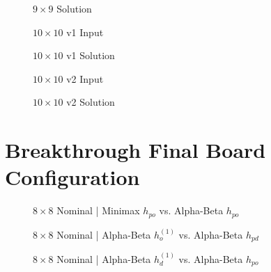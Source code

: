 \documentclass{article}[12pt]
\begin{document}
\begin{appendices}
\begin{figure}[!htb]
	\centering
	\caption{$9 \times 9$ Solution}
\end{figure}

\begin{figure}[!htb]
	\centering
	\caption{$10 \times 10$ v1 Input}
\end{figure}

\begin{figure}[!htb]
	\centering
	\caption{$10 \times 10$ v1 Solution}
\end{figure}
   
   \begin{figure}[!htb]
   	\centering
   	\caption{$10 \times 10$ v2 Input}
   \end{figure}
   
   \begin{figure}[!htb]
   	\centering
   	\caption{$10 \times 10$ v2 Solution}
   \end{figure}
   
   
   \section{Breakthrough Final Board Configuration}
   \label{appendix:bt}
   
   \begin{figure}[!htb]
   	\centering
   	\caption{$8 \times 8$ Nominal | Minimax $h_{po}$ vs. Alpha-Beta $h_{po}$}
   \end{figure}

\begin{figure}[!htb]
	\centering
	\caption{$8 \times 8$ Nominal | Alpha-Beta $h_{o}^{(1)}$ vs. Alpha-Beta $h_{pd}$}
\end{figure}

\begin{figure}[!htb]
	\centering
	\caption{$8 \times 8$ Nominal | Alpha-Beta $h_{d}^{(1)}$ vs. Alpha-Beta $h_{po}$}
\end{figure}


\end{appendices}
\end{document}
